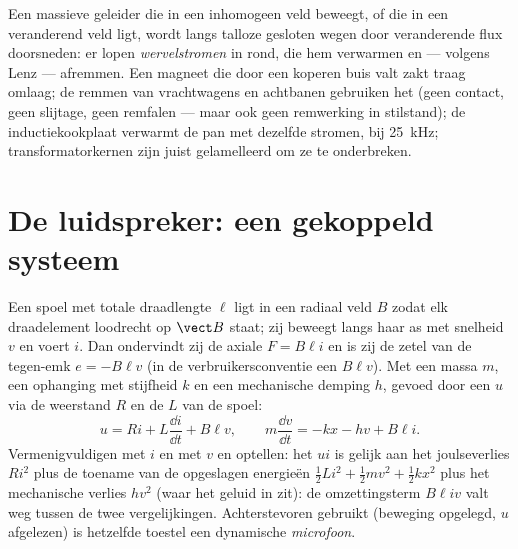 \begin{example}[Wervelstromen]\label{ex:b1:induction:eddy}
Een massieve geleider die in een inhomogeen veld beweegt, of die in een
veranderend veld ligt, wordt langs talloze gesloten wegen door veranderende flux doorsneden:
er lopen \emph{wervelstromen} in rond, die hem verwarmen en --- volgens Lenz ---
afremmen. Een magneet die door een koperen buis valt zakt traag omlaag; de
remmen van vrachtwagens en achtbanen gebruiken het (geen contact, geen slijtage, geen
remfalen --- maar ook geen remwerking in stilstand); de inductiekookplaat verwarmt
de pan met dezelfde stromen, bij \qty{25}{kHz}; transformatorkernen zijn
juist gelamelleerd om ze te onderbreken.
\end{example}

\section{De luidspreker: een gekoppeld systeem}

\begin{proposition}\label{prop:b1:induction:loudspeaker}
Een spoel met totale draadlengte $\ell$ ligt in een radiaal veld $B$ zodat
elk draadelement loodrecht op $\vect B$ staat; zij beweegt langs haar
as met snelheid $v$ en voert $i$. Dan ondervindt zij de axiale 
$F = B\ell i$ en is zij de zetel van de tegen-emk $e = -B\ell v$ (in de
verbruikersconventie een  $B\ell v$). Met een massa $m$, een ophanging met
stijfheid $k$ en een mechanische demping $h$, gevoed door een  $u$ via
de weerstand $R$ en de  $L$ van de spoel:
\[
u = Ri + L\frac{\dd i}{\dd t} + B\ell v , \qquad
m\frac{\dd v}{\dd t} = -kx - hv + B\ell i .
\]
Vermenigvuldigen met $i$ en met $v$ en optellen: het  $ui$
is gelijk aan het joulseverlies $Ri^2$ plus de toename van de opgeslagen energieën
$\tfrac12Li^2 + \tfrac12mv^2 + \tfrac12kx^2$ plus het mechanische verlies
$hv^2$ (waar het geluid in zit): de omzettingsterm $B\ell iv$ valt weg
tussen de twee vergelijkingen. Achterstevoren gebruikt (beweging opgelegd, $u$ afgelezen) is
hetzelfde toestel een dynamische \emph{microfoon}.
\end{proposition}

